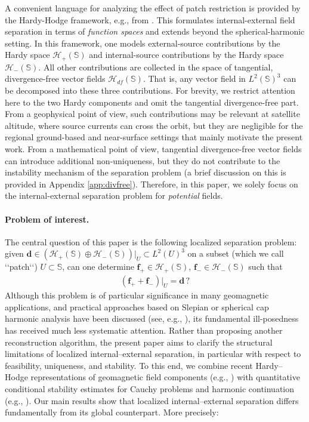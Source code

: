 \documentclass[a4paper, 11pt]{article}
\renewcommand{\SS}{\mathbb{S}}
\newcommand{\f}{\mathbf{f}}
\begin{document}
A convenient language for analyzing the effect of patch restriction is provided by the Hardy-Hodge framework, e.g., from \cite{BGK,gerhuakeg23}. This formulates internal-external field separation in terms of \emph{function spaces} and extends beyond the spherical-harmonic setting. In this framework, one models external-source contributions by the Hardy space $\mathcal  H_+(\SS)$ and internal-source contributions by the Hardy space $\mathcal  H_-(\SS)$. All other contributions are collected in the space of tangential, divergence-free vector fields $\mathcal H_{df}(\SS)$. That is, any vector field in $L^2(\SS)^3$ can be decomposed into these three contributions. For brevity, we restrict attention here to the two Hardy components and omit the tangential divergence-free part. From a geophysical point of view, such contributions may be relevant at satellite altitude, where source currents can cross the orbit, but they are negligible for the regional ground-based and near-surface settings that mainly motivate the present work. From a mathematical point of view, tangential divergence-free vector fields can introduce additional non-uniqueness, but they do not contribute to the instability mechanism of the separation problem (a brief discussion on this is provided in Appendix \ref{app:divfree}). Therefore, in this paper, we solely focus on the internal-external separation problem for \emph{potential} fields.

\paragraph{Problem of interest.} The central question of this paper is the following localized separation problem: given $\mathbf{d}\in (\mathcal  H_+(\SS)\oplus \mathcal  H_-(\SS))|_U\subset L^2(U)^3$ on a subset (which we call \lq\lq patch\lq\lq) $U\subset\SS$, can one determine $\f_+\in\mathcal H_+(\SS)$, $\f_-\in\mathcal H_-(\SS)$ such that
\begin{align}
(\f_+ + \f_-)\big|_{U}=\mathbf{d}\,?\label{eqn:probform}
\end{align}
Although this problem is of particular significance in many geomagnetic applications, and practical approaches based on Slepian or spherical cap harmonic analysis have been discussed (see, e.g., \cite{plattnersimons14b,Plattner2017,Torta2019}), its fundamental ill-posedness has received much less systematic attention. Rather than proposing another reconstruction algorithm, the present paper aims to clarify the structural limitations of localized internal--external separation, in particular with respect to feasibility, uniqueness, and stability. To this end, we combine recent Hardy--Hodge representations of geomagnetic field components (e.g., \cite{BGK,gerhuakeg23}) with quantitative conditional stability estimates for Cauchy problems and harmonic continuation (e.g., \cite{aleron09,bou10,isakov12,ruesal19}).
Our main results show that localized internal--external separation differs fundamentally from its global counterpart. More precisely:
\end{document}
